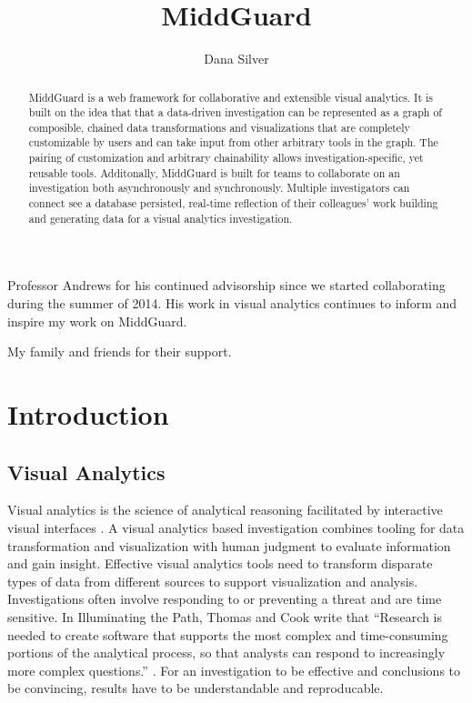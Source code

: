 \documentclass[midd]{thesis}
\title {MiddGuard}
\author {Dana Silver}
\begin{document}
\maketitle

\begin{abstract}

MiddGuard is a web framework for collaborative and extensible visual analytics.
It is built on the idea that that a data-driven investigation can be represented
as a graph of composible, chained data transformations and visualizations that
are completely customizable by users and can take input from other arbitrary
tools in the graph. The pairing of customization and arbitrary chainability
allows investigation-specific, yet reusable tools. Additonally, MiddGuard is
built for teams to collaborate on an investigation both asynchronously and
synchronously. Multiple investigators can connect see a database persisted,
real-time reflection of their colleagues' work building and generating data for
a visual analytics investigation.

\end{abstract}

\begin{acknowledgements}

Professor Andrews for his continued advisorship since we started collaborating
during the summer of 2014. His work in visual analytics continues to inform and
inspire my work on MiddGuard.

My family and friends for their support.

\end{acknowledgements}

\contentspage
\figurelistpage

\normalspacing \setcounter{page}{1} 

\chapter{Introduction}

\section{Visual Analytics}

Visual analytics is the science of analytical reasoning facilitated by
interactive visual interfaces \cite{illuminate}. A visual analytics based
investigation combines tooling for data transformation and visualization with
human judgment to evaluate information and gain insight. Effective visual
analytics tools need to transform disparate types of data from different sources
to support visualization and analysis. Investigations often involve responding
to or preventing a threat and are time sensitive. In Illuminating the Path,
Thomas and Cook write that ``Research is needed to create software that supports
the most complex and time-consuming portions of the analytical process, so that
analysts can respond to increasingly more complex questions.''
\cite{illuminate}. For an investigation to be effective and conclusions to be
convincing, results have to be understandable and reproducable.
\end{document}
